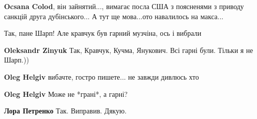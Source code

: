\begin{itemize}
\begin{itemize}
 
\textbf{Ocsana Colod}, він зайнятий..., вимагає посла США з поясненями з приводу санкцій друга дубінського... А тут ще мова...ото навалилось на макса...
\end{itemize}

 
Так, пане Шарп! Але кравчук був гарний музчіна, ось і вибрали

\begin{itemize}
 
\textbf{Oleksandr Zinyuk} Так, Кравчук, Кучма, Янукович. Всі гарні були. Тільки я не Шарп.))

 
\textbf{Oleg Helgiv} вибачте, гостро пишете... не завжди дивлюсь хто

 
\textbf{Oleg Helgiv} Може не *грані*, а гарні?

 
\textbf{Лора Петренко} Так. Виправив. Дякую.
\end{itemize}


\end{itemize}
